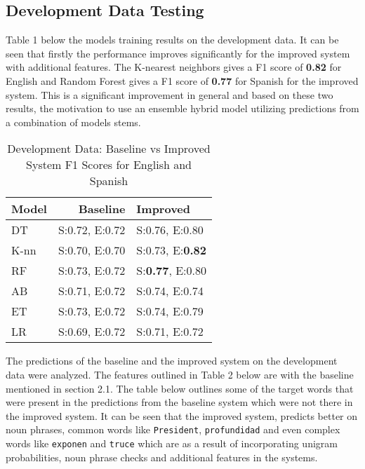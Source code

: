 \documentclass[10pt,a4paper]{article}
\begin{document}
\subsection{Development  Data Testing}
Table 1 below the models training results on the development data. It can be seen that firstly the performance improves significantly for the improved system with additional features. The K-nearest neighbors gives a F1 score of \textbf{0.82} for English and Random Forest gives a F1 score of \textbf{0.77} for Spanish for the improved system. This is a significant improvement in general and based on these two results, the motivation to use an ensemble hybrid model utilizing predictions from a combination of models stems. \cite{malmasi2016ltg}
\begin{table}[!htbp]
\begin{center}
\begin{tabular}{|l|rl|}
\hline \bf Model & \bf Baseline & \bf Improved  \\ \hline
DT & S:0.72, E:0.72 & S:0.76, E:0.80 \\
K-nn & S:0.70, E:0.70 & S:0.73, E:\textbf{0.82} \\
RF &  S:0.73, E:0.72  & S:\textbf{0.77}, E:0.80 \\
AB  &  S:0.71, E:0.72  & S:0.74, E:0.74 \\
ET &  S:0.73, E:0.72  & S:0.74, E:0.79 \\
LR &  S:0.69, E:0.72  & S:0.71, E:0.72 \\
\hline
\end{tabular}
\end{center}
\caption{Development Data: Baseline vs Improved System F1 Scores for English and Spanish }
\end{table}

The predictions of the baseline and the improved system on the development data were analyzed. The features outlined in Table 2 below are with the baseline mentioned in section 2.1. The table below outlines some of the target words that were present in the predictions from the baseline system which were not there in the improved system. It can be seen that the improved system, predicts better on noun phrases, common words like \texttt{President}, \texttt{profundidad} and even complex words like \texttt{exponen} and  \texttt{truce} which are as a result of incorporating unigram probabilities, noun phrase checks and additional features in the systems.
\end{document}

